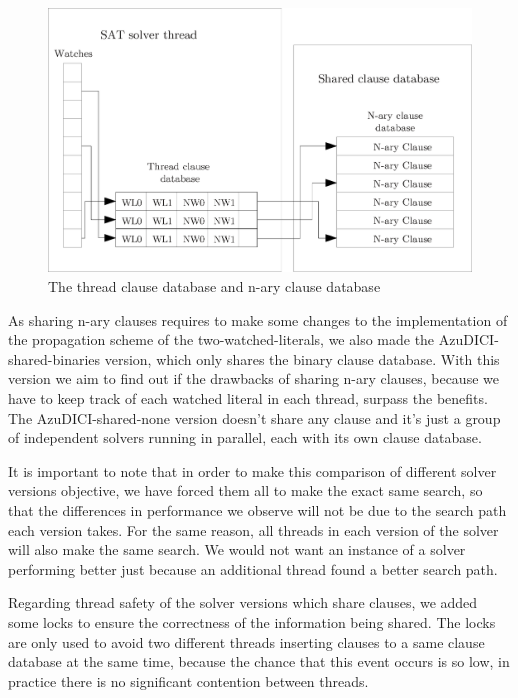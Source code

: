 \documentclass{llncs}
\begin{document}
\begin{figure}[tp]
  \centering
  \includegraphics[scale=0.6]{AzuDICI_design}
  \caption{The thread clause database and n-ary clause database}
  \label{fig:azu design}
\end{figure}

As sharing n-ary clauses requires to make some changes to the
implementation of the propagation scheme of the two-watched-literals,
we also made the AzuDICI-shared-binaries version, which only shares
the binary clause database. With this version we aim to find out
if the drawbacks of sharing n-ary clauses, because we have to keep
track of each watched literal in each thread, surpass the benefits.
The AzuDICI-shared-none version doesn't share any clause and it's
just a group of independent solvers running in parallel, each with
its own clause database.

It is important to note that in order to make this comparison of
different solver versions objective, we have forced them all to make
the exact same search, so that the differences in performance we
observe will not be due to the search path each version takes.
For the same reason, all threads in each version of the solver will
also make the same search. We would not want an instance of a
solver performing better just because an additional thread found
a better search path.

Regarding thread safety of the solver versions which share clauses,
we added some locks to ensure the correctness of the information
being shared. The locks are only used to avoid two different threads
inserting clauses to a same clause database at the same time,
because the chance that this event occurs is so low, in practice
there is no significant contention between threads.
\end{document}
